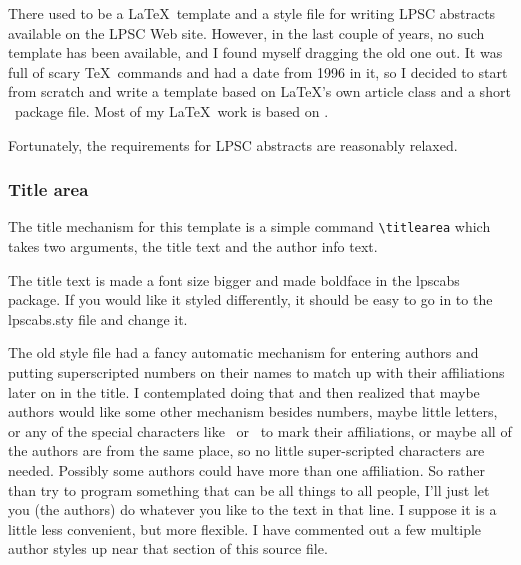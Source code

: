 \documentclass[twoside]{article}
\begin{document}


%



There used to be a \LaTeX\ template and a style file for writing
LPSC abstracts available on the LPSC Web site.  However, in the
last couple of years, no such template has been available, and I
found myself dragging the old one out.  It was full of scary \TeX\
commands and had a date from 1996 in it, so I decided to start from
scratch and write a template based on \LaTeX's own article class and 
a short \LaTeXe\ package file.  Most of my \LaTeX\ work is based on
\citet{latexguide}.

Fortunately, the requirements for LPSC abstracts \citep{LPSC} are
reasonably relaxed.

\subsubsection*{Title area}

The title mechanism for this template is a simple command
\verb=\titlearea= which takes two arguments, the title text and the
author info text.

The title text is made a font size bigger and made boldface in the
lpscabs package.  If you would like it styled differently, it should
be easy to go in to the lpscabs.sty file and change it.

The old style file had a fancy automatic mechanism for entering
authors and putting superscripted numbers on their names to match
up with their affiliations later on in the title.  I contemplated
doing that and then realized that maybe authors would like some
other mechanism besides numbers, maybe little letters, or any of
the special characters like \dag\ or \ddag\ to mark their affiliations,
or maybe all of the authors are from the same place, so no little
super-scripted characters are needed.  Possibly some authors could have
more than one affiliation.  So rather than try to program something
that can be all things to all people, I'll just let you (the authors)
do whatever you like to the text in that line.  I suppose it is a 
little less convenient, but more flexible.  I have commented out
a few multiple author styles up near that section of this source 
file.
\end{document}
